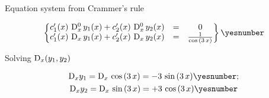 \documentclass["AM3C-Slides_annotations.tex"]{subfiles}
\begin{document}
\begin{exampleBox}
  Equation system from Crammer's rule
  \begin{tcolorbox}
    \begin{gather*}
      \begin{Bmatrix}
        {
          c_1'(x)\,\mdif[0]{x}\,y_1(x) 
          + c_2'(x)\,\mdif[0]{x}\,y_2(x)
        } &=& 0
        \\ {
          c_1'(x)\,\mdif[1]{x}\,y_1(x) 
          + c_2'(x)\,\mdif[1]{x}\,y_2(x)
        } &=& \frac{1}{\cos{(3\,x)}}
      \end{Bmatrix}
      \yesnumber\label{eq:e.14 eq system}
    \end{gather*}
  \end{tcolorbox}

  Solving \(\mdif{x}{(y_1,y_2)}\)
  \begin{tcolorbox}
    \begin{gather*}
      \mdif[1]{x}{y_1}
      = \mdif[1]{x}\,\cos{(3\,x)}
      = -3\,\sin{(3\,x)}
      \yesnumber\label{eq:e.14 D1x(y_1)}
      ; \\
      \mdif[1]{x}{y_2}
      = \mdif[1]{x}\,\sin{(3\,x)}
      = +3\,\cos{(3\,x)}
      \yesnumber\label{eq:e.14 D1x(y_2)}
    \end{gather*}
  \end{tcolorbox}

\end{exampleBox}
\end{document}
